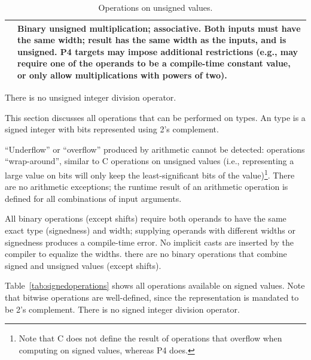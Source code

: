 \documentclass[12pt]{article}
\begin{document}
\begin{table}[!h]
\begin{tabular}{|lp{\descwidth}|}
    \code{*} & Binary unsigned multiplication; associative.  Both
    inputs must have the same width; result has the same width as
    the inputs, and is unsigned.  P4 targets may impose additional
    restrictions (e.g., may require one of the operands to be a
    compile-time constant value, or only allow multiplications with
    powers of two). \\
    
    \hline
  \end{tabular}
  \caption{Operations on unsigned values.\label{tab:unsignedoperations}}
\end{table}

There is no unsigned integer division operator.


This section discusses all operations that can be performed on
\Int{\W} types.  An \Int{\W} type is a signed integer with \W{} bits
represented using 2's complement.

``Underflow'' or ``overflow'' produced by arithmetic cannot be
detected: operations ``wrap-around'', similar to C operations on
unsigned values (i.e., representing a large value on \W{} bits will
only keep the least-significant \W{} bits of the value)\footnote{Note that C
does not define the result of operations that overflow when computing
on signed values, whereas P4 does.}. There are no arithmetic
exceptions; the runtime result of an arithmetic operation is defined
for all combinations of input arguments.

All binary operations (except shifts) require both operands to have
the same exact type (signedness) and width; supplying operands with
different widths or signedness produces a compile-time error.  No
implicit casts are inserted by the compiler to equalize the widths.
there are no binary operations that combine signed and unsigned values
(except shifts).

Table~\ref{tab:signedoperations} shows all operations available on
signed values. Note that bitwise operations are well-defined, since the
representation is mandated to be 2's complement. There is no signed 
integer division operator.
\end{document}
